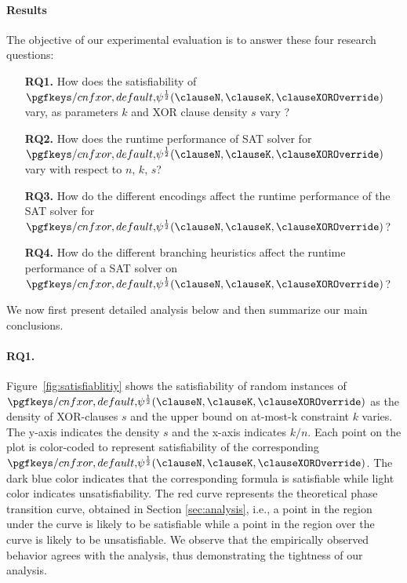 
\paragraph{Results}
The objective of our experimental evaluation is to answer these four research questions:
\begin{enumerate}[itemsep=1pt,leftmargin=9.5mm]
	\item[\bf{RQ1.}] How does the satisfiability of $\FQ$ vary, as parameters $k$  and XOR clause density $s$ vary ?
	\item[\bf{RQ2.}] How does the runtime performance of SAT solver for $\FQ$ vary with respect to $n$, $k$, $s$?
	\item[\bf{RQ3.}] How do the different encodings affect the runtime performance of the SAT solver for $\FQ$?
	\item[\bf{RQ4.}] How do the different branching heuristics affect the runtime performance of a SAT solver on $\FQ$?
\end{enumerate}
We now first present detailed analysis below and then summarize our main conclusions. 

\paragraph{\bf{RQ1.}}Figure~\ref{fig:satisfiablitiy} shows the satisfiability of random instances of $\FQ$ as the density of XOR-clauses $s$  and the upper bound on at-most-k constraint $k$ varies. The y-axis indicates the density $s$ and the x-axis indicates $k/n$. Each point on the plot is color-coded to represent satisfiability of the corresponding $\FQ$. The dark blue color indicates that the corresponding formula is satisfiable while light color indicates unsatisfiability. The red curve represents the theoretical phase transition curve,  obtained in Section \ref{sec:analysis}, i.e., a point in the region under the curve is likely to be satisfiable while a point in the region over the curve is likely to be unsatisfiable. We observe that the empirically observed behavior agrees with the analysis, thus demonstrating the tightness of our analysis. 

